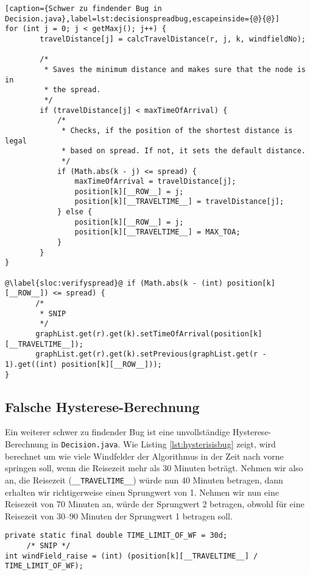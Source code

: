 \begin{lstlisting}[caption={Schwer zu findender Bug in
Decision.java},label=lst:decisionspreadbug,escapeinside={@}{@}]
for (int j = 0; j < getMaxj(); j++) {
        travelDistance[j] = calcTravelDistance(r, j, k, windfieldNo);
        
        /*
         * Saves the minimum distance and makes sure that the node is in
         * the spread.
         */
        if (travelDistance[j] < maxTimeOfArrival) {
        	/*
        	 * Checks, if the position of the shortest distance is legal
        	 * based on spread. If not, it sets the default distance.
        	 */
        	if (Math.abs(k - j) <= spread) {
        		maxTimeOfArrival = travelDistance[j];
        		position[k][__ROW__] = j;
        		position[k][__TRAVELTIME__] = travelDistance[j];
        	} else {
        		position[k][__ROW__] = j;
        		position[k][__TRAVELTIME__] = MAX_TOA;
        	}
        }
}

@\label{sloc:verifyspread}@ if (Math.abs(k - (int) position[k][__ROW__]) <= spread) {
       /*
        * SNIP
        */
       graphList.get(r).get(k).setTimeOfArrival(position[k][__TRAVELTIME__]);
       graphList.get(r).get(k).setPrevious(graphList.get(r - 1).get((int) position[k][__ROW__]));
}

\end{lstlisting}

\subsection{Falsche Hysterese-Berechnung}
Ein weiterer schwer zu findender Bug ist eine unvollständige
Hysterese-Berechnung in \texttt{Decision.java}. Wie Listing
\ref{lst:hysterisisbug} zeigt, wird berechnet um wie viele Windfelder der
Algorithmus in der Zeit nach vorne springen soll, wenn die Reisezeit mehr als
30 Minuten beträgt. Nehmen wir also an, die Reisezeit
(\texttt{\_\_TRAVELTIME\_\_}) würde nun 40 Minuten betragen, dann erhalten wir
richtigerweise einen Sprungwert von 1. Nehmen wir nun eine Reisezeit von 70
Minuten an, würde der Sprungwert 2 betragen, obwohl für eine Reisezeit von
30--90 Minuten der Sprungwert 1 betragen soll.
\begin{lstlisting}[caption={Hystereseberechnung in Decision.java},label=lst:hysterisisbug]
private static final double TIME_LIMIT_OF_WF = 30d;
     /* SNIP */
int windField_raise = (int) (position[k][__TRAVELTIME__] / TIME_LIMIT_OF_WF);
\end{lstlisting}

